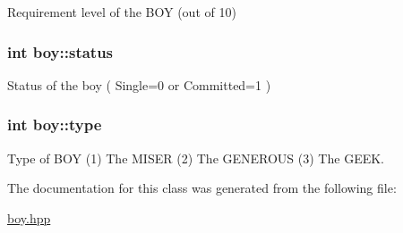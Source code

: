 Requirement level of the B\-O\-Y (out of 10) 

\hypertarget{classboy_a9cefa4f67f3e53439a6baa96628a9a8a}{
\subsubsection[{status}]{\setlength{\rightskip}{0pt plus 5cm}int boy\-::status}}\label{classboy_a9cefa4f67f3e53439a6baa96628a9a8a}


Status of the boy ( Single=0 or Committed=1 ) 

\hypertarget{classboy_a53f19b290e6f6930623ca571a7d38e18}{
\subsubsection[{type}]{\setlength{\rightskip}{0pt plus 5cm}int boy\-::type}}\label{classboy_a53f19b290e6f6930623ca571a7d38e18}


Type of B\-O\-Y (1) The M\-I\-S\-E\-R (2) The G\-E\-N\-E\-R\-O\-U\-S (3) The G\-E\-E\-K. 



The documentation for this class was generated from the following file\-:\begin{DoxyCompactItemize}
\item 
\hyperlink{boy_8hpp}{boy.\-hpp}\end{DoxyCompactItemize}
